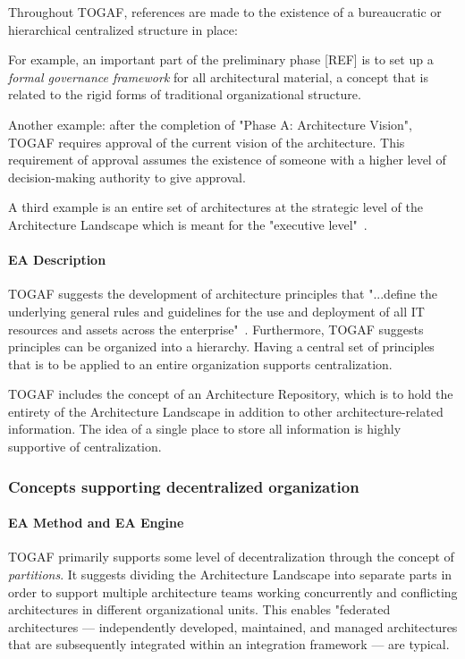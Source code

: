 Throughout TOGAF, references are made to the existence of a bureaucratic or hierarchical centralized structure in place: 

For example, an important part of the preliminary phase [REF] is to set up a \textit{formal governance framework} for all architectural material, a concept that is related to the rigid forms of traditional organizational structure. 

Another example: after the completion of "Phase A: Architecture Vision", TOGAF requires approval of the current vision of the architecture. This requirement of approval assumes the existence of someone with a higher level of decision-making authority to give approval. 

A third example is an entire set of architectures at the strategic level of the Architecture Landscape which is meant for the "executive level"~\cite{togaf9.1}.

\paragraph*{EA Description}
TOGAF suggests the development of architecture principles that "...define the underlying general rules and guidelines for the use and deployment of all IT resources and assets across the enterprise"~\cite{togaf9.1}. Furthermore, TOGAF suggests principles can be organized into a hierarchy. Having a central set of principles that is to be applied to an entire organization supports centralization.

TOGAF includes the concept of an Architecture Repository, which is to hold the entirety of the Architecture Landscape in addition to other architecture-related information. The idea of a single place to store all information is highly supportive of centralization. 

\subsubsection{Concepts supporting decentralized organization}
\paragraph*{EA Method and EA Engine}
TOGAF primarily supports some level of decentralization through the concept of \textit{partitions}. It suggests dividing the Architecture Landscape into separate parts in order to support multiple architecture teams working concurrently and conflicting architectures in different organizational units. This enables "federated architectures — independently developed, maintained, and managed architectures that are subsequently integrated within an integration framework — are typical. 

